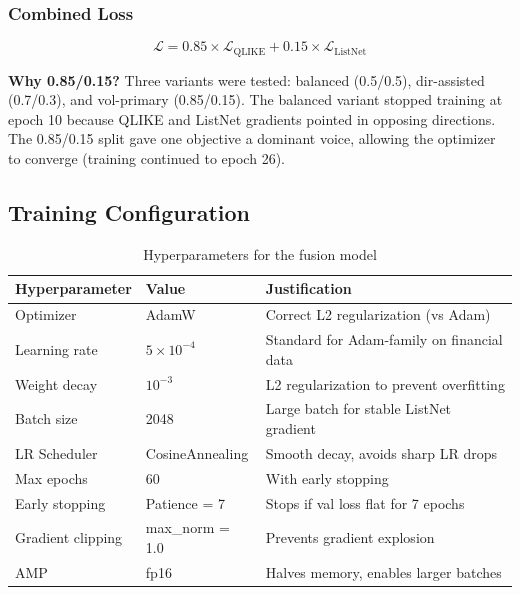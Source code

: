 \subsubsection{Combined Loss}

\begin{equation}
    \mathcal{L} = 0.85 \times \mathcal{L}_{\text{QLIKE}} + 0.15 \times \mathcal{L}_{\text{ListNet}}
\end{equation}

\textbf{Why 0.85/0.15?} Three variants were tested: balanced (0.5/0.5), dir-assisted (0.7/0.3), and vol-primary (0.85/0.15). The balanced variant stopped training at epoch 10 because QLIKE and ListNet gradients pointed in opposing directions. The 0.85/0.15 split gave one objective a dominant voice, allowing the optimizer to converge (training continued to epoch 26).

\subsection{Training Configuration}

\begin{table}[H]
\centering
\caption{Hyperparameters for the fusion model}
\begin{tabular}{lll}
\toprule
\textbf{Hyperparameter} & \textbf{Value} & \textbf{Justification} \\
\midrule
Optimizer         & AdamW            & Correct L2 regularization (vs Adam) \\
Learning rate     & $5 \times 10^{-4}$ & Standard for Adam-family on financial data \\
Weight decay      & $10^{-3}$        & L2 regularization to prevent overfitting \\
Batch size        & 2048             & Large batch for stable ListNet gradient \\
LR Scheduler      & CosineAnnealing  & Smooth decay, avoids sharp LR drops \\
Max epochs        & 60               & With early stopping \\
Early stopping    & Patience = 7     & Stops if val loss flat for 7 epochs \\
Gradient clipping & max\_norm = 1.0  & Prevents gradient explosion \\
AMP               & fp16             & Halves memory, enables larger batches \\
\bottomrule
\end{tabular}
\end{table}

